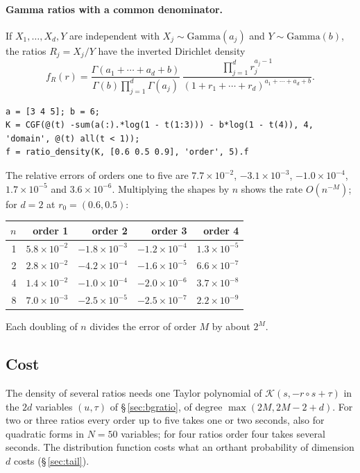 \documentclass[11pt]{article}
\newcommand{\K}{\mathcal{K}}
\begin{document}
\paragraph{Gamma ratios with a common denominator.} If $X_1,\ldots,X_d,Y$ are independent with
$X_j\sim\mathrm{Gamma}(a_j)$ and $Y\sim\mathrm{Gamma}(b)$, the ratios $R_j=X_j/Y$ have the inverted
Dirichlet density
\[
f_R(r)=\frac{\Gamma(a_1+\cdots+a_d+b)}{\Gamma(b)\prod_{j=1}^{d}\Gamma(a_j)}\,
\frac{\prod_{j=1}^{d}r_j^{a_j-1}}{(1+r_1+\cdots+r_d)^{a_1+\cdots+a_d+b}}.
\]
\begin{lstlisting}
a = [3 4 5]; b = 6;
K = CGF(@(t) -sum(a(:).*log(1 - t(1:3))) - b*log(1 - t(4)), 4, 'domain', @(t) all(t < 1));
f = ratio_density(K, [0.6 0.5 0.9], 'order', 5).f
\end{lstlisting}
The relative errors of orders one to five are $7.7\times10^{-2}$, $-3.1\times10^{-3}$,
$-1.0\times10^{-4}$, $1.7\times10^{-5}$ and $3.6\times10^{-6}$. Multiplying the shapes by $n$ shows
the rate $O(n^{-M})$; for $d=2$ at $r_0=(0.6,0.5)$:
\begin{center}
\begin{tabular}{rrrrr}
\toprule
$n$ & order 1 & order 2 & order 3 & order 4\\
\midrule
1 & $5.8\times10^{-2}$ & $-1.8\times10^{-3}$ & $-1.2\times10^{-4}$ & $1.3\times10^{-5}$\\
2 & $2.8\times10^{-2}$ & $-4.2\times10^{-4}$ & $-1.6\times10^{-5}$ & $6.6\times10^{-7}$\\
4 & $1.4\times10^{-2}$ & $-1.0\times10^{-4}$ & $-2.0\times10^{-6}$ & $3.7\times10^{-8}$\\
8 & $7.0\times10^{-3}$ & $-2.5\times10^{-5}$ & $-2.5\times10^{-7}$ & $2.2\times10^{-9}$\\
\bottomrule
\end{tabular}
\end{center}
Each doubling of $n$ divides the error of order $M$ by about $2^M$.

\subsection{Cost}

The density of several ratios needs one Taylor polynomial of $\K(s,-r\circ s+\tau)$ in the $2d$
variables $(u,\tau)$ of \S\,\ref{sec:bgratio}, of degree $\max(2M,2M-2+d)$. For two or three
ratios every order up to five takes one or two seconds, also for quadratic forms in $N=50$ variables;
for four ratios order four takes several seconds. The distribution function costs what an orthant
probability of dimension $d$ costs (\S\,\ref{sec:tail}).
\end{document}
